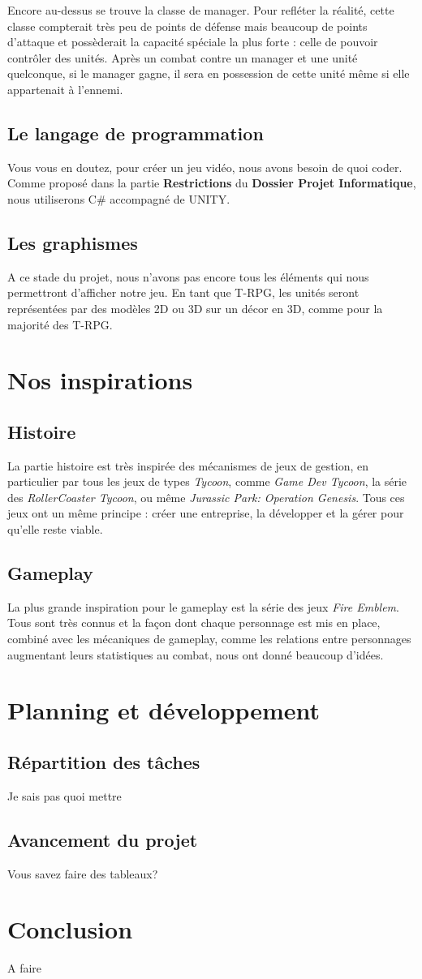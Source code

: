 \documentclass{article}
\begin{document}
Encore au-dessus se trouve la classe de manager. Pour refléter la réalité, cette classe compterait très peu de points de défense mais beaucoup de points d'attaque et possèderait la capacité spéciale la plus forte : celle de pouvoir contrôler des unités. Après un combat contre un manager et une unité quelconque, si le manager gagne, il sera en possession de cette unité même si elle appartenait à l'ennemi. 

\subsection{Le langage de programmation}
Vous vous en doutez, pour créer un jeu vidéo, nous avons besoin de quoi coder. Comme proposé dans la partie \textbf{Restrictions} du \textbf{Dossier Projet Informatique}, nous utiliserons C\# accompagné de UNITY. 

\subsection{Les graphismes}
A ce stade du projet, nous n'avons pas encore tous les éléments qui nous permettront d'afficher notre jeu. En tant que T-RPG, les unités seront représentées par des modèles 2D ou 3D sur un décor en 3D, comme pour la majorité des T-RPG.

\section{Nos inspirations}
\subsection{Histoire}
La partie histoire est très inspirée des mécanismes de jeux de gestion, en particulier par tous les jeux de types \textit{Tycoon}, comme \textit{Game Dev Tycoon}, la série des \textit{RollerCoaster Tycoon}, ou même \textit{Jurassic Park: Operation Genesis}. Tous ces jeux ont un même principe : créer une entreprise, la développer et la gérer pour qu'elle reste viable.
\subsection{Gameplay}
La plus grande inspiration pour le gameplay est la série des jeux \textit{Fire Emblem}. Tous sont très connus et la façon dont chaque personnage est mis en place, combiné avec les mécaniques de gameplay, comme les relations entre personnages augmentant leurs statistiques au combat, nous ont donné beaucoup d'idées.

\section{Planning et développement}
\subsection{Répartition des tâches}
Je sais pas quoi mettre
\subsection{Avancement du projet}
Vous savez faire des tableaux?

\section{Conclusion}
A faire
\end{document}
